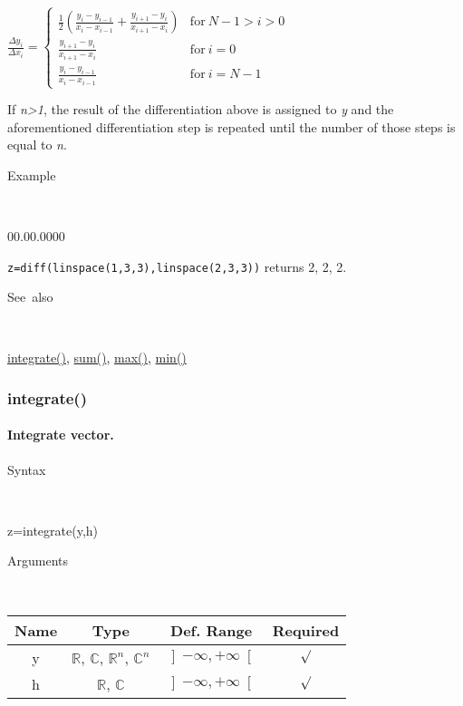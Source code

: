 \medskip{}
${\displaystyle \frac{\Delta y_{i}}{\Delta x_{i}}}=$$\left\{ \begin{array}{cc}
{\displaystyle \frac{1}{2}\left(\frac{y_{i}-y_{i-1}}{x_{i}-x_{i-1}}+\frac{y_{i+1}-y_{i}}{x_{i+1}-x_{i}}\right)} & \textrm{for}\: N-1>i>0\\
{\displaystyle \frac{y_{i+1}-y_{i}}{x_{i+1}-x_{i}}} & \textrm{for}\: i=0\\
{\displaystyle \frac{y_{i}-y_{i-1}}{x_{i}-x_{i-1}}} & \textrm{for}\: i=N-1\end{array}\right.$
\medskip{}

\noindent If \textit{n>1}, the result of the differentiation above
is assigned to \textit{y} and the aforementioned differentiation step
is repeated until the number of those steps is equal to \textit{n}.

\begin{description}
\item [Example]~
\end{description}
\begin{lyxlist}{00.00.0000}
\item [\texttt{z=diff(linspace(1,3,3),linspace(2,3,3))}]returns 2, 2, 2.
\end{lyxlist}
\begin{description}
\item [See~also]~
\end{description}
\textcolor{blue}{\hyperlink{integrate}{integrate()}}\textcolor{black}{,}
\textcolor{blue}{\hyperlink{sum}{sum()}}\textcolor{black}{,} \textcolor{blue}{\hyperlink{max}{max()}}\textcolor{black}{,}
\textcolor{blue}{\hyperlink{min}{min()}}


\newpage
\subsubsection*{\hypertarget{integrate}{}{\Large integrate()}}


\paragraph{\label{par:Integrate}Integrate vector.}

\begin{description}
\item [Syntax]~
\end{description}
z=integrate(y,h)

\begin{description}
\item [Arguments]~
\end{description}
\begin{tabular}{|c|c|c|c|}
\hline 
Name&
Type&
Def. Range&
Required\tabularnewline
\hline
\hline 
y&
$\mathbb{R}$, $\mathbb{C}$, $\mathbb{R}^{n}$, $\mathbb{C}^{n}$&
$\left]-\infty,+\infty\right[$&
$\surd$\tabularnewline
\hline 
h&
$\mathbb{R}$, $\mathbb{C}$&
$\left]-\infty,+\infty\right[$&
$\surd$\tabularnewline
\hline
\end{tabular}

